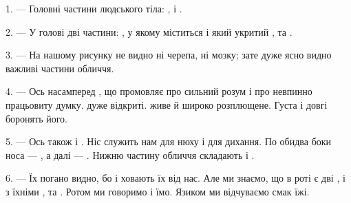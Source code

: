 %

\VUsaut{4.0mm}
\VUsaut{2.0mm}

\VUsaut{2.4mm}
\VUsaut{3.0mm}

1. --- Головні частини людського тіла: ,  і
.

\VUsaut{3.0mm}

2. --- У голові дві частини: , у якому міститься 
і який укритий , та .

3. --- На нашому рисунку не видно ні черепа, ні мозку; зате дуже ясно видно
важливі частини обличчя.

4. --- Ось насамперед , що промовляє про сильний розум і про
невпинно працьовиту думку.  дуже відкриті.  живе й
широко розплющене. Густа  і довгі  боронять його.

5. --- Ось також  і . Ніс служить нам для нюху і
для дихання. По обидва боки носа --- , а далі --- .
Нижню частину обличчя складають  і .

6. --- Їх погано видно, бо  і  ховають їх від нас.
Але ми знаємо, що в роті є дві ,  і
 з їхніми , та . Ротом ми
говоримо і їмо. Язиком ми відчуваємо смак їжі.

